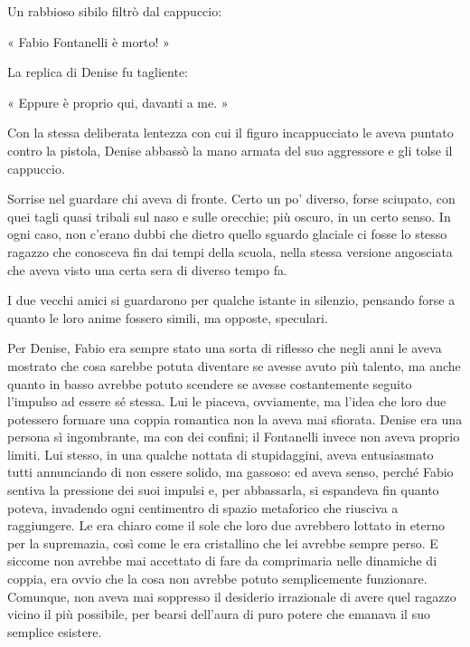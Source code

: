 Un rabbioso sibilo filtrò dal cappuccio:

« Fabio Fontanelli è morto! »

La replica di Denise fu tagliente:

« Eppure è proprio qui, davanti a me. »

Con la stessa deliberata lentezza con cui il figuro incappucciato le aveva puntato contro la pistola, Denise abbassò la mano armata del suo aggressore e gli tolse il cappuccio.

Sorrise nel guardare chi aveva di fronte. Certo un po' diverso, forse sciupato, con quei tagli quasi tribali sul naso e sulle orecchie; più oscuro, in un certo senso. In ogni caso, non c'erano dubbi che dietro quello sguardo glaciale ci fosse lo stesso ragazzo che conosceva fin dai tempi della scuola, nella stessa versione angosciata che aveva visto una certa sera di diverso tempo fa.

I due vecchi amici si guardarono per qualche istante in silenzio, pensando forse a quanto le loro anime fossero simili, ma opposte, speculari.

Per Denise, Fabio era sempre stato una sorta di riflesso che negli anni le aveva mostrato che cosa sarebbe potuta diventare se avesse avuto più talento, ma anche quanto in basso avrebbe potuto scendere se avesse costantemente seguito l'impulso ad essere sé stessa. Lui le piaceva, ovviamente, ma l'idea che loro due potessero formare una coppia romantica non la aveva mai sfiorata. Denise era una persona sì ingombrante, ma con dei confini; il Fontanelli invece non aveva proprio limiti. Lui stesso, in una qualche nottata di stupidaggini, aveva entusiasmato tutti annunciando di non essere solido, ma gassoso: ed aveva senso, perché Fabio sentiva la pressione dei suoi impulsi e, per abbassarla, si espandeva fin quanto poteva, invadendo ogni centimentro di spazio metaforico che riusciva a raggiungere. Le era chiaro come il sole che loro due avrebbero lottato in eterno per la supremazia, così come le era cristallino che lei avrebbe sempre perso. E siccome non avrebbe mai accettato di fare da comprimaria nelle dinamiche di coppia, era ovvio che la cosa non avrebbe potuto semplicemente funzionare. Comunque, non aveva mai soppresso il desiderio irrazionale di avere quel ragazzo vicino il più possibile, per bearsi dell'aura di puro potere che emanava il suo semplice esistere.

